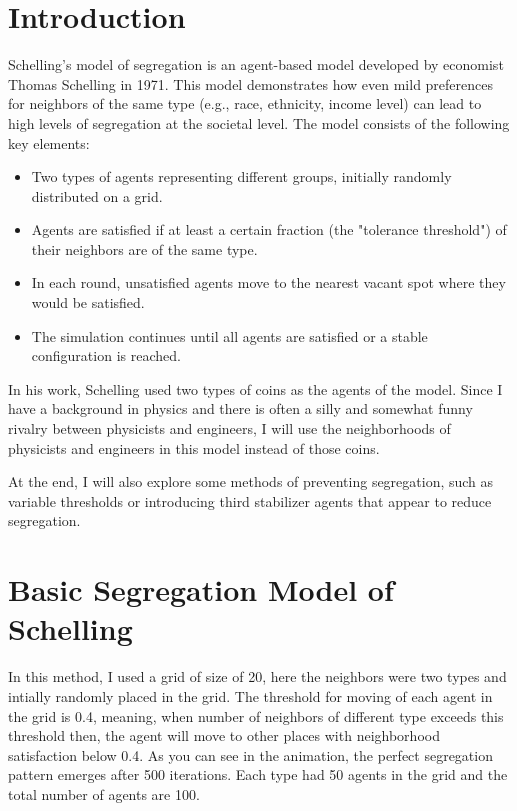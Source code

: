 \documentclass{article}
\begin{document}
\section{Introduction}

Schelling's model of segregation is an agent-based model developed by economist Thomas Schelling in 1971. This model demonstrates how even mild preferences for neighbors of the same type (e.g., race, ethnicity, income level) can lead to high levels of segregation at the societal level. The model consists of the following key elements:

\begin{itemize}
\item Two types of agents representing different groups, initially randomly distributed on a grid.
\item Agents are satisfied if at least a certain fraction (the "tolerance threshold") of their neighbors are of the same type.
\item In each round, unsatisfied agents move to the nearest vacant spot where they would be satisfied.
\item The simulation continues until all agents are satisfied or a stable configuration is reached.
\end{itemize}

In his work, Schelling used two types of coins as the agents of the model. Since I have a background in physics and there is often a silly and somewhat funny rivalry between physicists and engineers, I will use the neighborhoods of physicists and engineers in this model instead of those coins.

At the end, I will also explore some methods of preventing segregation, such as variable thresholds or introducing third stabilizer agents that appear to reduce segregation.

\section{Basic Segregation Model of Schelling}
In this method, I used a grid of size of 20, here the neighbors were two types and intially randomly placed in the grid. The threshold for moving of each agent in the grid is 0.4, meaning, when number of neighbors of different type exceeds this threshold then, the agent will move to other places with neighborhood satisfaction below 0.4. As you can see in the animation, the perfect segregation pattern emerges after 500 iterations. Each type had 50 agents in the grid and the total number of agents are 100.
\end{document}
